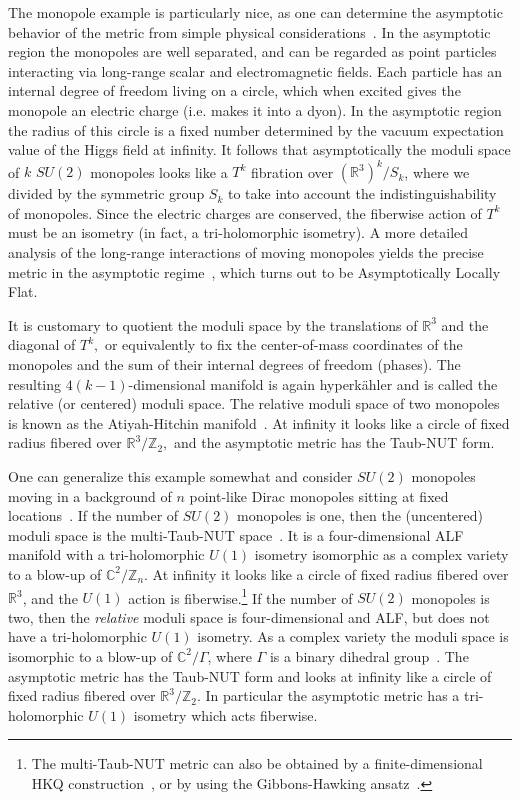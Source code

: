 \documentclass[a4paper,12pt, amsfonts, amssymb]{article}
\newcommand{\CC}{{\mathbb C}}
\newcommand{\RR}{{\mathbb R}}
\newcommand{\ZZ}{{\mathbb Z}}
\begin{document}
The monopole example is particularly nice, as one can determine the asymptotic
behavior of the metric from simple physical considerations~\cite{Mtn,GM}.
In the asymptotic region the monopoles are well separated, and can be regarded
as point particles interacting via long-range scalar and electromagnetic
fields. Each particle has an internal degree of freedom living on a circle,
which when excited gives the monopole an electric charge (i.e. makes it into
a dyon). In the asymptotic region the radius of this circle is a fixed
number determined by the vacuum expectation value of the Higgs field at
infinity. It follows that asymptotically the moduli space of $k$ $SU(2)$
monopoles looks like a $T^k$ fibration over $(\RR^3)^k/S_k$, where we divided
by the symmetric group $S_k$ to take into account the indistinguishability
of monopoles. Since the electric charges are conserved, the
fiberwise action of $T^k$ must be an isometry (in fact, a tri-holomorphic isometry).
A more detailed
analysis of the long-range interactions of moving monopoles yields
the precise metric in the asymptotic regime~\cite{Mtn,GM}, which turns out
to be Asymptotically Locally Flat.

It is customary to quotient the moduli
space by the translations of $\RR^3$ and the diagonal of $T^k,$ or equivalently to fix the center-of-mass coordinates of the monopoles
and the sum of their internal degrees of freedom (phases). The resulting $4(k-1)$-dimensional manifold is again hyperk\"ahler and is called the
relative (or centered) moduli space. The relative moduli
space of two monopoles is known as the Atiyah-Hitchin manifold~\cite{AH}. At infinity it looks
like a circle of fixed radius fibered
over $\RR^3/\ZZ_2,$ and the asymptotic metric has the Taub-NUT form.

One can generalize this example somewhat and consider $SU(2)$ monopoles moving in a background of $n$ point-like Dirac monopoles sitting at fixed locations~\cite{usthreed}. If the number of $SU(2)$ monopoles is one,
then the (uncentered) moduli space is the multi-Taub-NUT
space~\cite{KrTh,usthreed}.
It is a four-dimensional ALF manifold with a tri-holomorphic $U(1)$ isometry
isomorphic as a complex variety to a blow-up of $\CC^2/\ZZ_n.$
At infinity it looks like a circle of fixed radius fibered over $\RR^3$,
and the $U(1)$ action is fiberwise.\footnote{The multi-Taub-NUT metric can also be obtained by a finite-dimensional HKQ construction~\cite{HKLR}, or by using the Gibbons-Hawking ansatz~\cite{GH}.}
If the number of $SU(2)$ monopoles is two, then the
{\it relative} moduli space is four-dimensional and ALF, but does not have a
tri-holomorphic
$U(1)$ isometry. As a complex variety the moduli space is isomorphic to
a blow-up of $\CC^2/\Gamma$, where $\Gamma$ is a binary dihedral
group~\cite{usthreed}.
The asymptotic metric has the Taub-NUT form and looks at infinity like a circle of fixed radius fibered over $\RR^3/\ZZ_2$. In particular the
asymptotic metric has a tri-holomorphic $U(1)$ isometry which acts
fiberwise.
\end{document}
